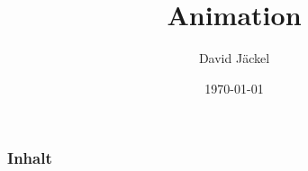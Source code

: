 \documentclass{beamer}
\title[Animation]{Animation}
\author{David Jäckel}
\institute[LT]{Jugend Hackt}
\date{\today}
\begin{document}
\begin{frame}
\titlepage
\end{frame}

\begin{frame}
  \frametitle{Inhalt}
  \tableofcontents
\end{frame}





\end{document}

